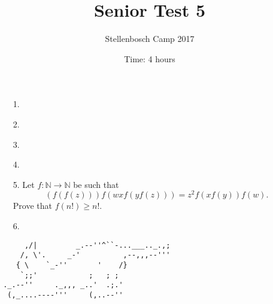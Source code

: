 \documentclass[12pt]{article}
\title{Senior Test 5}
\author{Stellenbosch Camp 2017}
\date{Time: 4 hours}
\begin{document}
 \maketitle

\begin{enumerate}

\item[1.] %


\item[2.] %


\item[3.] %


\item[4.] %
 

\item[5.] %
Let $f : \mathbb{N} \to \mathbb{N}$ be such that
  \[ (f(f(z))) f(wx f(y f(z))) = z^2 f(xf(y)) f(w) .\]
Prove that $f(n!) \geq n!$.


\item[6.] %


\end{enumerate}

\vfill

\centering
\begin{BVerbatim}
      ,/|         _.--''^``-...___.._.,;
     /, \'.     _-'          ,--,,,--'''
    { \    `_-''       '    /}
     `;;'            ;   ; ;
 ._.--''     ._,,, _..'  .;.'
  (,_....----'''     (,..--''
\end{BVerbatim}
\end{document}
